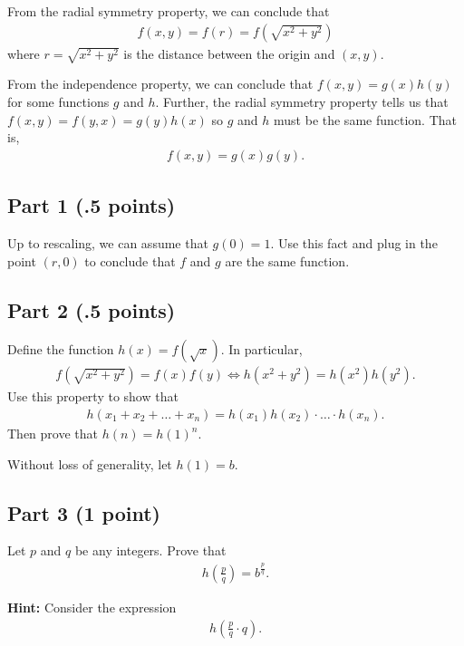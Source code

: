 \documentclass{article}
\begin{document}
From the radial symmetry property, we can conclude that
\begin{align}\label{eq:radial_symmetry}
f(x,y) = f(r) = f(\sqrt{x^2 + y^2})
\end{align}
where $r=\sqrt{x^2+y^2}$ is the distance between the origin and $(x,y)$.

From the independence property, we can conclude that $f(x,y) = g(x) h(y)$ for some functions $g$ and $h$.
Further, the radial symmetry property tells us that $f(x,y) = f(y,x) = g(y) h(x)$ so $g$ and $h$ must be the same function.
That is,
\begin{align}\label{eq:independence}
f(x,y) = g(x) g(y).
\end{align}

\subsection*{Part 1 (.5 points)} 

Up to rescaling, we can assume that $g(0)=1$.
Use this fact and plug in the point $(r,0)$ to conclude that $f$ and $g$ are the same function.

\subsection*{Part 2 (.5 points)}

Define the function $h(x) = f(\sqrt{x})$.
In particular,
\begin{align}\label{eq:define_h}
f(\sqrt{x^2 + y^2}) = f(x) f(y) \Leftrightarrow
h(x^2 + y^2) = h(x^2) h(y^2).
\end{align}
Use this property to show that
\begin{align}\label{eq:h_linear}
h(x_1 + x_2 + \ldots + x_n) = h(x_1) h(x_2) \cdot \ldots \cdot h(x_n).
\end{align}
Then prove that $h(n) = h(1)^n$.

Without loss of generality, let $h(1) = b$.

\subsection*{Part 3 (1 point)}

Let $p$ and $q$ be any integers.
Prove that 
\begin{align}\label{eq:to_prove}
h\left(\frac{p}{q}\right) = b^{\frac{p}{q}}.
\end{align}

\textbf{Hint:} Consider the expression
\begin{align*}
h\left(\frac{p}{q} \cdot q \right).
\end{align*}
\end{document}
